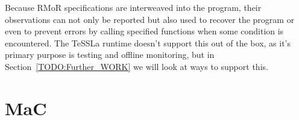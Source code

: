 Because RMoR specifications are interweaved into the program, their observations can not only be reported but also used to recover the program or even to prevent errors by calling specified functions when some condition is encountered.
The TeSSLa runtime doesn't support this out of the box, as it's primary purpose is testing and offline monitoring, but in Section~\ref{TODO:Further_WORK} we will look at ways to support this.

\section{MaC}
